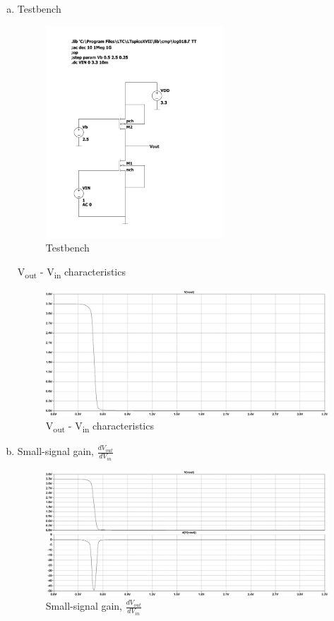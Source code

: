 \documentclass{article}
\begin{document}
\begin{enumerate}[(a)]
\item Testbench
\begin{figure}[H]
\centering
\includegraphics[height=300px]{img/q4/testbench-q4.pdf}
\caption{\label{fig:testbench-q4}Testbench}
\end{figure}

V\textsubscript{out} - V\textsubscript{in} characteristics
\begin{figure}[H]
\centering
\includegraphics[width=.9\linewidth]{img/q4/a.pdf}
\caption{\label{fig:vout-q4}V\textsubscript{out} - V\textsubscript{in} characteristics}
\end{figure}

\item Small-signal gain, \(\frac{dV_{out}}{dV_{in}}\)
\begin{figure}[H]
\centering
\includegraphics[width=.9\linewidth]{img/q4/b.pdf}
\caption{\label{fig:dvout-q4}Small-signal gain, \(\frac{dV_{out}}{dV_{in}}\)}
\end{figure}


\end{enumerate}
\end{document}
